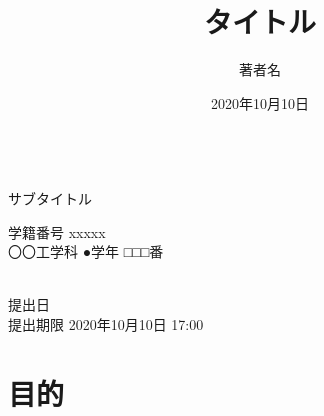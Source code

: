 \documentclass[a4j,uplatex]{jsarticle}
\title{タイトル}
\author{著者名}
\date{2020年10月10日}
\makeatletter
\newcommand{\@subtitle}{サブタイトル}
\newcommand{\@affiliation}{学籍番号 xxxxx \\ 〇〇工学科 ●学年 □□□番}
\newcommand{\@limit}{2020年10月10日 17:00}
\makeatother
\begin{document}
\begin{titlepage}
  \begin{center}
  \vspace*{120truept}
  {\huge \@title}\\ %
  \vspace{10truept}
  {\Large \@subtitle}\\ %
  \end{center}



  \vspace{120truept}

  \vspace{50truept}
  \begin{center}
    {\LARGE \@affiliation}\\
    \vspace{15truept}
    {\LARGE \@author}\\ %
  \end{center}

  \vspace{50truept}
  \begin{center}
    {\large 提出日 \@date}\\ %
    {\large 提出期限 \@limit}\\ %
  \end{center}
\end{titlepage}



\section{目的}
\end{document}
